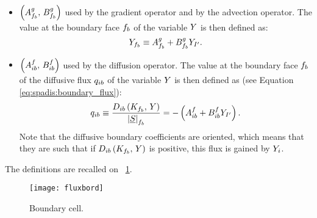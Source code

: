 \begin{itemize}
\item $\left( A^g_{f_{b}} , \, B^g_{f_{b}}\right)$ used by the gradient operator and by the advection operator.
The value at the boundary face ${f_{b}}$ of the variable $Y$ is
then defined as:
\begin{equation}\label{eq:bndcnd:coef_g_def}
Y_{f_{b}} \equiv A^g_{f_{b}} + B^g_{f_{b}} Y_{I^\prime}.
\end{equation}
%
\item $\left( A^f_{ib} , \, B^f_{ib}\right)$ used by the diffusion operator.
The value at the boundary face ${f_{b}}$ of the diffusive flux $q_{ib}$ of the variable $Y$
is then defined as (see Equation \eqref{eq:spadis:boundary_flux}):
\begin{equation}\label{eq:bndcnd:coef_f_def}
q_{ib} \equiv \dfrac{D_{ib} \left( K_{f_{b}} , \, Y \right)}{\left| \underline{S} \right|_{f_{b}}} = -\left(A^f_{ib} + B^f_{ib}  Y_{I^\prime}\right).
\end{equation}
Note that the diffusive boundary coefficients are oriented, which means that they are such that if $D_{ib} \left( K_{f_{b}} , \, Y \right) $ is positive,
this flux is gained by $Y_i$.
\end{itemize}
The definitions are recalled on \figurename~\ref{fig:bndcnd:boundary_flux}.

\begin{figure}[!htpb]
\centering
\texttt{[image: fluxbord]}
\caption{Boundary cell.\label{fig:bndcnd:boundary_flux}}
\end{figure}

